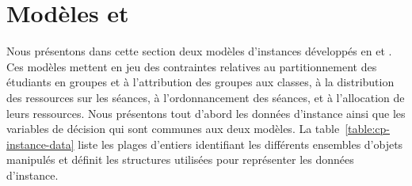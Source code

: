 \section{Modèles \MINIZINC{} et \CHR{}}%
\label{sec:model}
\setcounter{equation}{0}
Nous présentons dans cette section deux modèles d'instances {\UTP} développés en \MINIZINC{} et \CHR{}.
Ces modèles mettent en jeu des contraintes relatives
au partitionnement des étudiants en groupes et à l'attribution des groupes aux classes,
à la distribution des ressources sur les séances,
à l'ordonnancement des séances,
et à l'allocation de leurs ressources.
Nous présentons tout d'abord les données d'instance
ainsi que les variables de décision qui sont communes aux deux modèles.
La table~\ref{table:cp-instance-data} liste les plages d'entiers identifiant les différents ensembles d'objets manipulés et définit les structures utilisées pour représenter les données d'instance.


